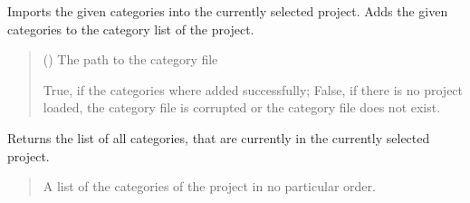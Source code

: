 \documentclass[letterpaper,10pt,english]{sphinxmanual}
\begin{document}
\begin{fulllineitems}
\begin{fulllineitems}
\begin{quote}
\begin{description}
\sphinxAtStartPar
{}

\end{description}\end{quote}

\end{fulllineitems}


\begin{fulllineitems}
\label{\detokenize{apidoc/src.osm_configurator.control:src.osm_configurator.control.control_interface.IControl.import_category_configuration}}
\pysigstartsignatures
{}
\pysigstopsignatures
\sphinxAtStartPar
Imports the given categories into the currently selected project.
Adds the given categories to the category list of the project.
\begin{quote}\begin{description}
\sphinxAtStartPar
{} () \textendash{} The path to the category file

\sphinxAtStartPar
True, if the categories where added successfully; False, if there is no project loaded, the category file is corrupted or the category file does not exist.

\sphinxAtStartPar
{}

\end{description}\end{quote}

\end{fulllineitems}


\begin{fulllineitems}
\label{\detokenize{apidoc/src.osm_configurator.control:src.osm_configurator.control.control_interface.IControl.get_list_of_categories}}
\pysigstartsignatures
{}
\pysigstopsignatures
\sphinxAtStartPar
Returns the list of all categories, that are currently in the currently selected project.
\begin{quote}\begin{description}
\sphinxAtStartPar
A list of the categories of the project in no particular order.


\end{description}
\end{quote}
\end{fulllineitems}
\end{fulllineitems}
\end{document}
